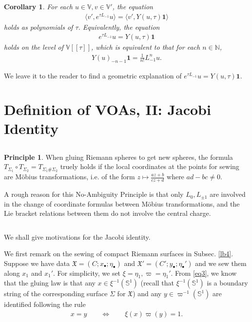 \documentclass[12pt,a4paper,notitlepage]{article}
\theoremstyle{definition}
\newtheorem{prin}[df]{Principle}
\theoremstyle{plain}
\newtheorem{co}[df]{Corollary}
\newcommand{\fk}{\mathfrak}
\newcommand{\id}{\mathbf{1}}
\newcommand{\bigbk}[1]{\big\langle {#1}\big\rangle}
\newcommand{\blt}{\bullet}
\newcommand{\Vbb}{\mathbb V}
\newcommand{\Nbb}{\mathbb N}
\newcommand{\Sbb}{{\mathbb S}}
\numberwithin{equation}{section}
\begin{document}
\begin{co}\label{lb78}
For each $u\in\Vbb,v\in\Vbb'$, the equation
\begin{align*}
\bigbk{v',e^{\tau L_{-1}}u}=\bigbk{v',Y(u,\tau)\id}	
\end{align*}
holds as polynomials of $\tau$. Equivalently, the equation
\begin{align*}
e^{\tau L_{-1}}u=Y(u,\tau)\id	
\end{align*}
holds on the level of $\Vbb[[\tau]]$, which is equivalent to that for each $n\in\Nbb$,
\begin{align}
Y(u)_{-n-1}\id=\frac 1{n!}L_{-1}^n u.\label{eq52}	
\end{align}
\end{co}


We leave it to the reader to find a geometric explanation of  $e^{\tau L_{-1}}u=Y(u,\tau)\id$.




\section{Definition of VOAs, II: Jacobi Identity}


\subsection{}

\begin{prin}
When gluing Riemann spheres to get new spheres, the formula $T_{\Sigma_1}\circ T_{\Sigma_2}=T_{\Sigma_1\#\Sigma_2}$ truely holds if the local coordinates at the points for sewing are M\"obius transformations, i.e. of the form $z\mapsto \frac {az+b}{cz+d}$ where $ad-bc\neq0$.
\end{prin}


A rough reason for this No-Ambiguity Principle is that only $L_0,L_{\pm 1}$ are involved in the change of coordinate formulas between M\"obius transformations, and the Lie bracket relations between them do not involve the central charge.



\subsection{}\label{lb156}

We shall give motivations for the Jacobi identity. 


We first remark on the sewing of compact Riemann surfaces in Subsec. \ref{lb4}. Suppose we have data $\fk X=(C;x_\blt;\eta_\blt)$ and $\fk X'=(C';y_\blt;\eta_\blt')$ and we sew them along $x_1$ and $x_1'$. For simplicity, we set $\xi=\eta_1,\varpi=\eta_1'$. From \eqref{eq3}, we know that the gluing law is that any $x\in\xi^{-1}(\Sbb^1)$ (recall that $\xi^{-1}(\Sbb^1)$ is a boundary string of the corresponding surface $\Sigma$ for $\fk X$) and any $y\in\varpi^{-1}(\Sbb^1)$ are identified following the rule
\begin{align}
x=y\qquad \Longleftrightarrow\qquad\xi(x)\varpi(y)=1.\label{eq41}
\end{align}
\end{document}
